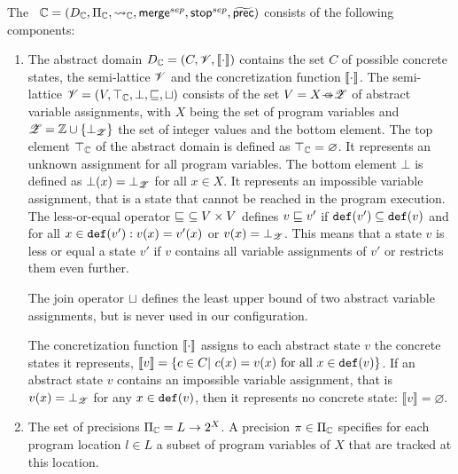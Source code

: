 The \ $\mathbb{C} = (D_{\mathbb{C}}, \Pi_{\mathbb{C}}, \rightsquigarrow_{\mathbb{C}}, \operatorname{\operatorname{\mathsf{merge}}}^{sep}, \operatorname{\operatorname{\mathsf{stop}}}^{sep}, \operatorname{\widetilde{\operatorname{\operatorname{\mathsf{prec}}}}})$ consists of the following components:
\begin{enumerate}[leftmargin=*, label=\arabic*.]
\item
The abstract domain $D_{\mathbb{C}} = (C, \mathscr{V}, \llbracket \cdot \rrbracket)$ contains the set $C$ of possible concrete states, the semi-lattice $\mathscr{V}$ and the concretization function $\llbracket \cdot \rrbracket$.
	The semi-lattice $\mathscr{V} = (V, \top_{\mathbb{C}}, \bot, \sqsubseteq, \sqcup)$ consists of the set $\valAssignment = X \partialFunc \valueset$ of abstract variable assignments,
	with $X$ being the set of program variables and $\mathscr{Z} = \mathbb{Z} \cup \{ \bot_{\mathscr{Z}} \}$ the set of integer values and the bottom element.
	The top element $\top_{\mathbb{C}}$ of the abstract domain is defined as $\top_{\mathbb{C}} = \varnothing$. It represents an unknown assignment for all program variables.
	The bottom element $\bot$ is defined as $\bot(x) = \bot_{\mathscr{Z}}$ for all $x \in X$.
	It represents an impossible variable assignment, that is a state that cannot be reached in the program execution.
	The less-or-equal operator $\sqsubseteq\ \subseteq V \times V$ defines $v \sqsubseteq v'$ if $\texttt{def}(v') \subseteq \texttt{def}(v)$ and for all $x \in \texttt{def}(v'): v(x) = v'(x)$ or $v(x) = \bot_{\mathscr{Z}}$.
	This means that a state $v$ is less or equal a state $v'$ if $v$ contains all variable assignments of $v'$ or restricts them even further.

	The join operator $\sqcup$ defines the least upper bound of two abstract variable assignments, but is never used in our configuration.
	
	The concretization function $\llbracket \cdot \rrbracket$ assigns to each abstract state $v$ the concrete states it represents, $\llbracket v \rrbracket = \{ c \in C |\ c(x) = v(x) \text{ for all } x \in \texttt{def}(v)\}$.
	If an abstract state $v$ contains an impossible variable assignment, that is $v(x) = \bot_{\mathscr{Z}}$ for any $x \in \texttt{def}(v)$, then it represents no concrete state: $\llbracket v \rrbracket = \varnothing$.

\item
The set of precisions $\Pi_{\mathbb{C}} = L \rightarrow 2^X$. A precision $\pi \in \Pi_{\mathbb{C}}$ specifies for each program location $l \in L$ a subset of program variables of $X$ that are tracked at this location.


\end{enumerate}
